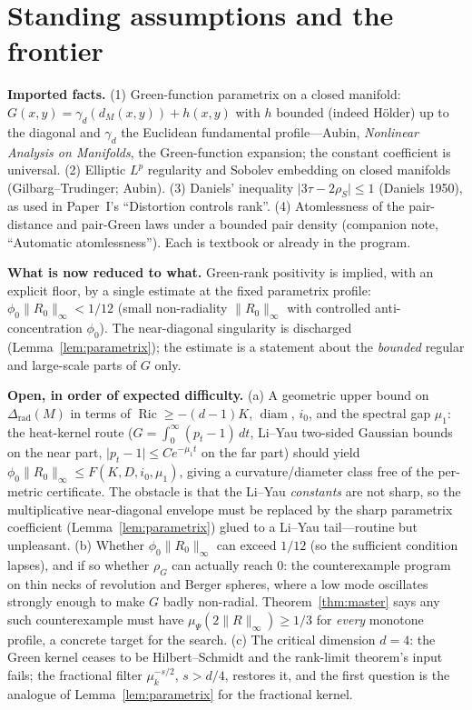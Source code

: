 \documentclass[11pt]{article}
\theoremstyle{remark}
\newcommand{\diam}{\operatorname{diam}}
\newcommand{\Rem}{R}
\newcommand{\dM}{d_M}
\newcommand{\rhoG}{\rho_G}
\DeclareMathOperator{\Ric}{Ric}
\begin{document}
\section{Standing assumptions and the frontier}\label{sec:frontier}

\noindent\textbf{Imported facts.} (1) Green-function parametrix on a closed manifold:
$G(x,y)=\gamma_d(\dM(x,y))+h(x,y)$ with $h$ bounded (indeed H\"older) up to the diagonal
and $\gamma_d$ the Euclidean fundamental profile---Aubin, \emph{Nonlinear Analysis on
Manifolds}, the Green-function expansion; the constant coefficient is universal. (2)
Elliptic $L^p$ regularity and Sobolev embedding on closed manifolds (Gilbarg--Trudinger;
Aubin). (3) Daniels' inequality $\lvert3\tau-2\rho_S\rvert\le1$ (Daniels 1950), as used in
Paper~I's ``Distortion controls rank''. (4) Atomlessness of the pair-distance and
pair-Green laws under a bounded pair density (companion note, ``Automatic atomlessness'').
Each is textbook or already in the program.

\medskip
\noindent\textbf{What is now reduced to what.} Green-rank positivity is implied, with an
explicit floor, by a single estimate at the fixed parametrix profile:
$\phi_0\lVert\Rem_0\rVert_\infty<1/12$ (small non-radiality $\lVert\Rem_0\rVert_\infty$ with
controlled anti-concentration $\phi_0$). The near-diagonal singularity is discharged
(Lemma~\ref{lem:parametrix}); the estimate is a statement about the \emph{bounded} regular
and large-scale parts of $G$ only.

\medskip
\noindent\textbf{Open, in order of expected difficulty.} (a) A geometric upper bound on
$\Delta_{\mathrm{rad}}(M)$ in terms of $\Ric\ge-(d-1)K$, $\diam$, $i_0$, and the spectral
gap $\mu_1$: the heat-kernel route ($G=\int_0^\infty(p_t-1)\,dt$, Li--Yau two-sided
Gaussian bounds on the near part, $\lvert p_t-1\rvert\le Ce^{-\mu_1 t}$ on the far part)
should yield $\phi_0\lVert\Rem_0\rVert_\infty\le F(K,D,i_0,\mu_1)$, giving a
curvature/diameter class free of the per-metric certificate. The obstacle is that the
Li--Yau \emph{constants} are not sharp, so the multiplicative near-diagonal envelope must
be replaced by the sharp parametrix coefficient (Lemma~\ref{lem:parametrix}) glued to a
Li--Yau tail---routine but unpleasant. (b) Whether $\phi_0\lVert\Rem_0\rVert_\infty$ can
exceed $1/12$ (so the sufficient condition lapses), and if so whether $\rhoG$ can actually
reach $0$: the counterexample
program on thin necks of revolution and Berger spheres, where a low mode oscillates
strongly enough to make $G$ badly non-radial. Theorem~\ref{thm:master} says any such
counterexample must have $\mu_\Psi(2\lVert\Rem\rVert_\infty)\ge1/3$ for \emph{every}
monotone profile, a concrete target for the search. (c) The critical dimension $d=4$: the
Green kernel ceases to be Hilbert--Schmidt and the rank-limit theorem's input fails; the
fractional filter $\mu_k^{-s/2}$, $s>d/4$, restores it, and the first question is the
analogue of Lemma~\ref{lem:parametrix} for the fractional kernel.
\end{document}
